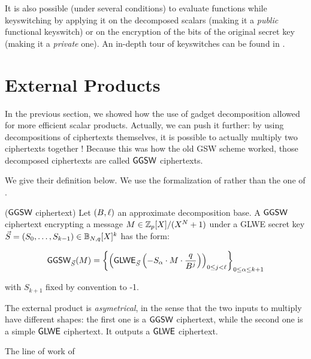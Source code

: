 


It is also possible (under several conditions) to evaluate functions while keyswitching by applying it on the decomposed scalars (making it a \textit{public} functional keyswitch) or on the encryption of the bits of the original secret key (making it a \textit{private} one). An in-depth tour of keyswitches can be found in \cite{these_tap}.


\section{External Products}
\label{sec:external_products}

In the previous section, we showed how the use of gadget decomposition allowed for more efficient scalar products. Actually, we can push it further: by using decompositions of ciphertexts themselves, it is possible to actually multiply two ciphertexts together ! Because this was how the old GSW scheme \cite{C:GenSahWat13} worked, those decomposed ciphertexts are called $\textsf{GGSW}$ ciphertexts.

We give their definition below. We use the formalization of \cite{AC:CLOT21} rather than the one of \cite{JC:CGGI20}.

\begin{definition}($\textsf{GGSW}$ ciphertext)
	Let $(B, \ell)$ an approximate decomposition base. A $\textsf{GGSW}$ ciphertext encrypting a message $M \in \mathbb{Z}_p[X] / (X^N + 1)$ under a GLWE secret key $\vec S =  (S_0, \dots, S_{k-1}) \in \mathbb{B}_{N, q}[X]^k$ has the form:
	
	\begin{equation*}
		\textsf{GGSW}_{\vec S}(M) = \left \lbrace \left ( \textsf{GLWE}_{\vec S}\left (-S_\alpha \cdot M \cdot \frac{q}{B^j} \right) \right )_{0 \le j < \ell} \right \rbrace_{0\le \alpha \le k+1}
	\end{equation*}
	
	with $S_{k+1}$ fixed by convention to -1.
\end{definition}




The external product is \textit{asymetrical}, in the sense that the two inputs to multiply have different shapes: the first one is a $\textsf{GGSW}$ ciphertext, while the second one is a simple $\textsf{GLWE}$ ciphertext. It outputs a $\textsf{GLWE}$ ciphertext.

The line of work of \cite{chimera, AC:BCGGJ24} 




